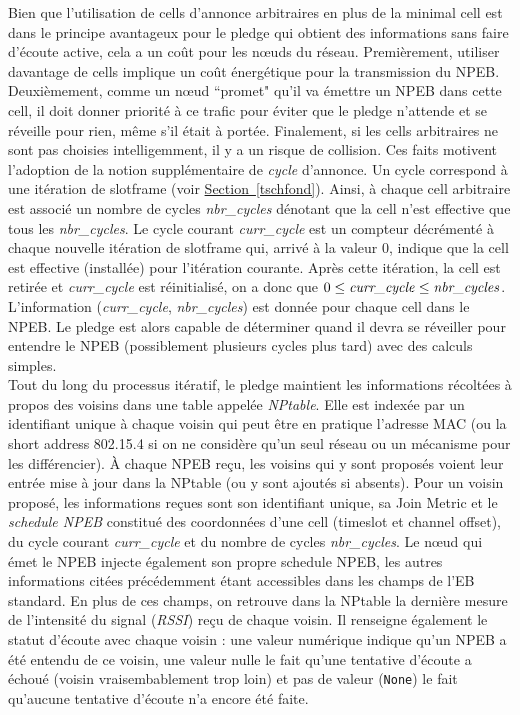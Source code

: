 \documentclass[]{report}
\newcommand{\wordlink}[2]{\hyperref[#2]{#1~\ref{#2}}}
\begin{document}
Bien que l'utilisation de cells d'annonce arbitraires en plus de la minimal cell est dans le principe avantageux pour le pledge qui obtient des informations sans faire d'écoute active, cela a un coût pour les nœuds du réseau. Premièrement, utiliser davantage de cells implique un coût énergétique pour la transmission du NPEB. Deuxièmement, comme un nœud ``promet" qu'il va émettre un NPEB dans cette cell, il doit donner priorité à ce trafic pour éviter que le pledge n'attende et se réveille pour rien, même s'il était à portée. Finalement, si les cells arbitraires ne sont pas choisies intelligemment, il y a un risque de collision. Ces faits motivent l'adoption de la notion supplémentaire de \textit{cycle} d'annonce. Un cycle correspond à une itération de slotframe (voir \wordlink{Section}{tschfond}). Ainsi, à chaque cell arbitraire est associé un nombre de cycles \textit{nbr\_cycles} dénotant que la cell n'est effective  que tous les \textit{nbr\_cycles}. Le cycle courant \textit{curr\_cycle} est un compteur décrémenté à chaque nouvelle itération de slotframe qui, arrivé à la valeur 0, indique que la cell est effective (installée) pour l'itération courante. Après cette itération, la cell est retirée et \textit{curr\_cycle} est réinitialisé, on a donc que $0 \leq \text{\textit{curr\_cycle}} \leq \text{\textit{nbr\_cycles}}$. L'information (\textit{curr\_cycle}, \textit{nbr\_cycles}) est donnée pour chaque cell dans le NPEB. Le pledge est alors capable de déterminer quand il devra se réveiller pour entendre le NPEB (possiblement plusieurs cycles plus tard) avec des calculs simples.\\

Tout du long du processus itératif, le pledge maintient les informations récoltées à propos des voisins dans une table appelée \textit{NPtable}. Elle est indexée par un identifiant unique à chaque voisin qui peut être en pratique l'adresse MAC (ou la short address 802.15.4 si on ne considère qu'un seul réseau ou un mécanisme pour les différencier). À chaque NPEB reçu, les voisins qui y sont proposés voient leur entrée mise à jour dans la NPtable (ou y sont ajoutés si absents). Pour un voisin proposé, les informations reçues sont son identifiant unique, sa Join Metric et le \textit{schedule NPEB} constitué des coordonnées d'une cell (timeslot et channel offset), du cycle courant \textit{curr\_cycle} et du nombre  de cycles \textit{nbr\_cycles}. Le nœud qui émet le NPEB injecte également son propre schedule NPEB, les autres informations citées précédemment étant accessibles dans les champs de l'EB standard. En plus de ces champs, on retrouve dans la NPtable la dernière mesure de l'intensité du signal (\textit{RSSI}) reçu de chaque voisin. Il renseigne également le statut d'écoute avec chaque voisin : une valeur numérique indique qu'un NPEB a été entendu de ce voisin, une valeur nulle le fait qu'une tentative d'écoute a échoué (voisin vraisembablement trop loin) et pas de valeur (\texttt{None}) le fait qu'aucune tentative d'écoute n'a encore été faite.
\vspace{0.5cm}
\end{document}

